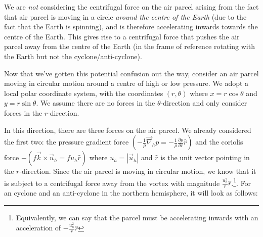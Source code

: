 We are \textit{not} considering the centrifugal force on the air parcel arising from the fact that air parcel is moving in a circle \textit{around the centre of the Earth} (due to the fact that the Earth is spinning), and is therefore accelerating inwards towards the centre of the Earth. This gives rise to a centrifugal force that pushes the air parcel away from the centre of the Earth (in the frame of reference rotating with the Earth but not the cyclone/anti-cyclone). 

Now that we've gotten this potential confusion out the way, consider an air parcel moving in circular motion around a centre of high or low pressure. We adopt a local polar coordinate system, with the coordinates \((r,\theta)\) where \(x=r\cos\theta\) and \(y=r\sin\theta\). We assume there are no forces in the \(\theta\)-direction and only consider forces in the \(r\)-direction.

In this direction, there are three forces on the air parcel. We already considered the first two: the pressure gradient force \(\left( -\frac{1}{\rho}\vec{\nabla}_h p = -\frac{1}{\rho}\frac{\partial p}{\partial r} \hat{r} \right)\) and the coriolis force \(-\left( f\vec{k}\times \vec{u}_h = fu_h\hat{r}  \right)\) where \(u_h=|\vec{u}_h|\) and \(\hat{r}\) is the unit vector pointing in the \(r\)-direction. Since the air parcel is moving in circular motion, we know that it is subject to a centrifugal force away from the vortex with magnitude \(\frac{u_h^2}{r}\hat{r}\).\footnote{Equivalently, we can say that the parcel must be accelerating inwards with an acceleration of \(-\frac{u_h^2}{r}\hat{r}\)}. For an cyclone and an anti-cyclone in the northern hemisphere, it will look as follows:

